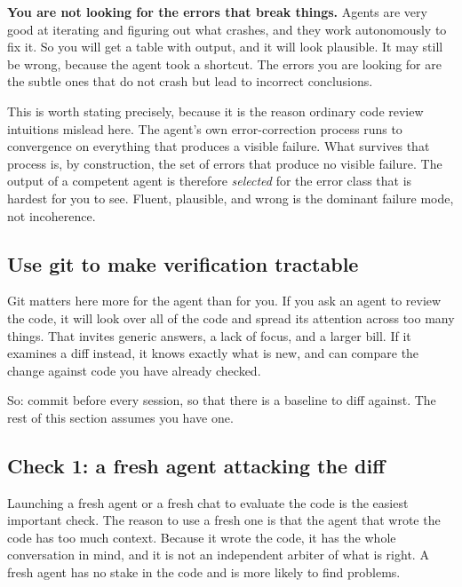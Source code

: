 \documentclass[11pt,a4paper]{article}
\begin{document}
\begin{aside}
\textbf{You are not looking for the errors that break things.} Agents are very
good at iterating and figuring out what crashes, and they work autonomously to
fix it. So you will get a table with output, and it will look plausible. It may
still be wrong, because the agent took a shortcut. The errors you are looking for
are the subtle ones that do not crash but lead to incorrect conclusions.
\end{aside}

This is worth stating precisely, because it is the reason ordinary code review
intuitions mislead here. The agent's own error-correction process runs to
convergence on everything that produces a visible failure. What survives that
process is, by construction, the set of errors that produce no visible failure.
The output of a competent agent is therefore \emph{selected} for the error class
that is hardest for you to see. Fluent, plausible, and wrong is the dominant
failure mode, not incoherence.

\subsection{Use git to make verification tractable}
\label{sec:diff}

Git matters here more for the agent than for you. If you ask an agent to review
the code, it will look over all of the code and spread its attention across too
many things. That invites generic answers, a lack of focus, and a larger bill. If
it examines a diff instead, it knows exactly what is new, and can compare the
change against code you have already checked.

So: commit before every session, so that there is a baseline to diff against. The
rest of this section assumes you have one.

\subsection{Check 1: a fresh agent attacking the diff}
\label{sec:check1}

Launching a fresh agent or a fresh chat to evaluate the code is the easiest
important check. The reason to use a fresh one is that the agent that wrote the
code has too much context. Because it wrote the code, it has the whole
conversation in mind, and it is not an independent arbiter of what is right. A
fresh agent has no stake in the code and is more likely to find problems.
\end{document}
